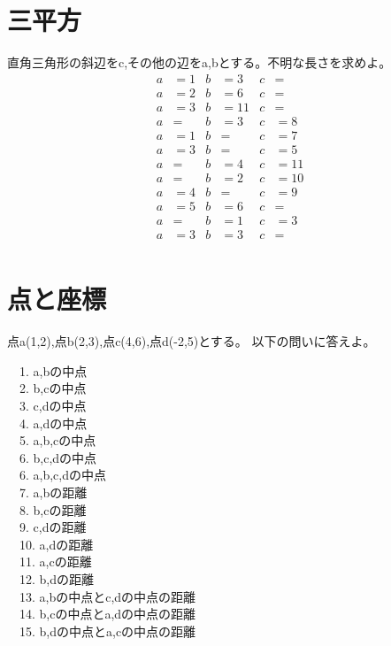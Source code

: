 \documentclass[paper=b4j,landscape,twocolumn,fleqn]{jlreq}
\begin{document}
\section{三平方}
直角三角形の斜辺をc,その他の辺をa,bとする。不明な長さを求めよ。
\begin{align*}
  a&=1 & b&=3 & c&= \\
  a&=2 & b&=6 & c&= \\
  a&=3 & b&=11 & c&= \\
  a&= & b&=3 & c&=8 \\
  a&=1 & b&= & c&=7 \\
  a&=3 & b&= & c&=5 \\
  a&= & b&=4 & c&=11 \\
  a&= & b&=2 & c&=10 \\
  a&=4 & b&= & c&=9 \\
  a&=5 & b&=6 & c&= \\
  a&= & b&=1 & c&=3 \\
  a&=3 & b&=3 & c&= \\
\end{align*}
\section{点と座標}
点a(1,2),点b(2,3),点c(4,6),点d(-2,5)とする。
以下の問いに答えよ。\\
\begin{flushleft}
　1. a,bの中点\\
　2. b,cの中点\\
　3. c,dの中点\\
　4. a,dの中点\\
　5. a,b,cの中点\\
　6. b,c,dの中点\\
　6. a,b,c,dの中点\\
　7. a,bの距離\\
　8. b,cの距離\\
　9. c,dの距離\\
　10. a,dの距離\\
　11. a,cの距離\\
　12. b,dの距離\\
　13. a,bの中点とc,dの中点の距離\\
　14. b,cの中点とa,dの中点の距離\\
　15. b,dの中点とa,cの中点の距離\\
\end{flushleft}

\newpage
\end{document}

